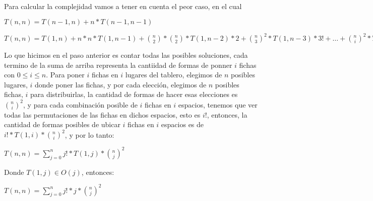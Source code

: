 Para calcular la complejidad vamos a tener en cuenta el peor caso, en el cual 


$T(n,n) = T(n-1,n) + n*T(n-1,n-1)$

$T(n,n) = T(1, n) + n*n * T(1, n-1) + \binom{n}{2} * \binom{n}{2} * T(1, n-2) * 2 + \binom{n}{3}^2 *T(1,n-3) * 3! + \hdots + \binom{n}{i}^2 * T(1, n-i) * i! + \hdots + T(1,1) * n!$

Lo que hicimos en el paso anterior es contar todas las posibles soluciones, cada termino de la suma de arriba representa la cantiidad de formas de ponner $i$ fichas con $0 \leq i \leq n$. Para poner $i$ fichas en $i$ lugares del tablero, elegimos de $n$ posibles lugares, $i$ donde poner las fichas, y por cada elección, elegimos de $n$ posibles fichas, $i$ para distribuirlas, la cantidad de formas de hacer esas elecciones es $\binom{n}{i}^2$, y para cada combinación posible de $i$ fichas en $i$ espacios, tenemos que ver todas las permutaciones de las fichas en dichos espacios, esto es $i!$, entonces, la cantidad de formas posibles de ubicar $i$ fichas en $i$ espacios es de $i! * T(1,i) * \binom{n}{i}^2$, y por lo tanto:

$T(n,n) = \sum_{j=0}^{n}{j! * T(1,j) * \binom{n}{j}^2}$

Donde $T(1,j) \in O(j)$, entonces:

$T(n,n) = \sum_{j=0}^{n}{j! * j * \binom{n}{j}^2}$

